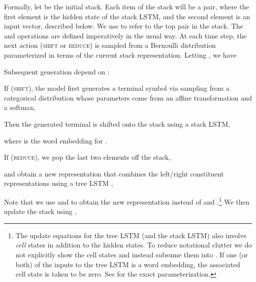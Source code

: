 \documentclass[11pt,a4paper]{article}
\newenvironment{itemizesquish}{\begin{list}{\labelitemi}{\setlength{\itemsep}{0em}\setlength{\labelwidth}{0.5em}\setlength{\leftmargin}{\labelwidth}\addtolength{\leftmargin}{\labelsep}}}{\end{list}}
\begin{document}
Formally, let  be the initial stack. Each item of the stack will be a pair, where the first element is the hidden state of the stack LSTM, and the second element is an input vector, described below. We use  to refer to the top pair in the stack. The  and  operations are defined imperatively in the usual way. At each time step, the next action  (\textsc{shift} or \textsc{reduce}) is sampled from a Bernoulli distribution parameterized in terms of the current stack representation. Letting , we have
        \vspace{-1mm}
    
Subsequent generation depend on :
\vspace{-1mm}
    \begin{itemizesquish}
    \item  If  (\textsc{shift}), the model first generates a terminal symbol via sampling from a categorical distribution whose parameters come from an affine transformation and a softmax,
    \vspace{-1mm}
        
        Then the generated terminal is shifted onto the stack using a stack LSTM,
        \vspace{-1mm}
        
        where  is the word embedding for .
        \vspace{-2mm}
    \item If  (\textsc{reduce}), we pop the last two elements off the stack,
            \vspace{-1.5mm}
        
        and obtain a new representation that combines the left/right constituent representations using a tree LSTM \cite{tai2015treelstm,zhu2015treelstm},
            \vspace{-2mm}
        
        Note that we use  and  to obtain the new representation instead of  and .\footnote{The update equations for the tree LSTM (and the stack LSTM) also involve \emph{cell} states in addition to the hidden states. To reduce notational clutter we do not explicitly show the cell states and instead subsume them into . If one (or both) of the inputs to the tree LSTM is a word embedding, the associated cell state is taken to be zero. See \citet{tai2015treelstm} for the exact parameterization.}
        We then update the stack using ,
                \vspace{-1mm}
        
\end{itemizesquish}
\end{document}

